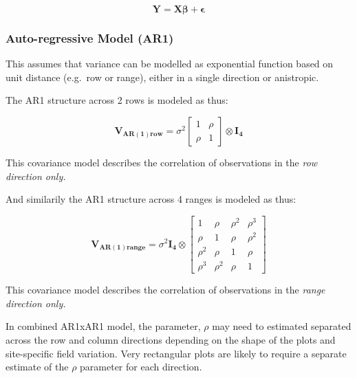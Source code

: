 \documentclass[]{book}
\begin{document}
\[ \mathbf{Y = X\beta + \epsilon}\]

\hypertarget{auto-regressive-model-ar1}{%
\subsubsection{Auto-regressive Model (AR1)}\label{auto-regressive-model-ar1}}

This assumes that variance can be modelled as exponential function based on unit distance (e.g.~row or range), either in a single direction or anistropic.

The AR1 structure across 2 rows is modeled as thus:

\[\mathbf { V_{AR(1)row}}  = \sigma^2
\left[ {\begin{array}{cc} 
1 & \rho \\
\rho & 1 
\end{array} } \right] \otimes \mathbf{I_4} \]

This covariance model describes the correlation of observations in the \emph{row direction only.}

And similarily the AR1 structure across 4 ranges is modeled as thus:

\[ \mathbf {V_{AR(1)range}} = \sigma^2 \mathbf{I_4} \otimes
\left[ {\begin{array}{cccc} 
1 & \rho & \rho^2 & \rho^3 \\
\rho & 1 & \rho & \rho^2  \\
\rho^2 & \rho & 1 & \rho  \\
\rho^3 & \rho^2 & \rho & 1
\end{array} } \right] \]

This covariance model describes the correlation of observations in the \emph{range direction only.}

In combined AR1xAR1 model, the parameter, \(\rho\) may need to estimated separated across the row and column directions depending on the shape of the plots and site-specific field variation. Very rectangular plots are likely to require a separate estimate of the \(\rho\) parameter for each direction.
\end{document}
